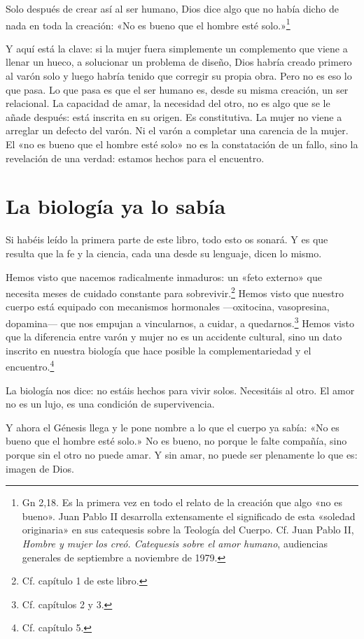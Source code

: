 Solo después de crear así al ser humano, Dios dice algo que no había dicho de nada en toda la creación: «No es bueno que el hombre esté solo.»\footnote{Gn 2,18. Es la primera vez en todo el relato de la creación que algo «no es bueno». Juan Pablo II desarrolla extensamente el significado de esta «soledad originaria» en sus catequesis sobre la Teología del Cuerpo. Cf. Juan Pablo II, \textit{Hombre y mujer los creó. Catequesis sobre el amor humano}, audiencias generales de septiembre a noviembre de 1979.}

Y aquí está la clave: si la mujer fuera simplemente un complemento que viene a llenar un hueco, a solucionar un problema de diseño, Dios habría creado primero al varón solo y luego habría tenido que corregir su propia obra. Pero no es eso lo que pasa. Lo que pasa es que el ser humano es, desde su misma creación, un ser relacional. La capacidad de amar, la necesidad del otro, no es algo que se le añade después: está inscrita en su origen. Es constitutiva. La mujer no viene a arreglar un defecto del varón. Ni el varón a completar una carencia de la mujer. El «no es bueno que el hombre esté solo» no es la constatación de un fallo, sino la revelación de una verdad: estamos hechos para el encuentro.

\section{La biología ya lo sabía}

Si habéis leído la primera parte de este libro, todo esto os sonará. Y es que resulta que la fe y la ciencia, cada una desde su lenguaje, dicen lo mismo.

Hemos visto que nacemos radicalmente inmaduros: un «feto externo» que necesita meses de cuidado constante para sobrevivir.\footnote{Cf. capítulo 1 de este libro.} Hemos visto que nuestro cuerpo está equipado con mecanismos hormonales ---oxitocina, vasopresina, dopamina--- que nos empujan a vincularnos, a cuidar, a quedarnos.\footnote{Cf. capítulos 2 y 3.} Hemos visto que la diferencia entre varón y mujer no es un accidente cultural, sino un dato inscrito en nuestra biología que hace posible la complementariedad y el encuentro.\footnote{Cf. capítulo 5.}

La biología nos dice: no estáis hechos para vivir solos. Necesitáis al otro. El amor no es un lujo, es una condición de supervivencia.

Y ahora el Génesis llega y le pone nombre a lo que el cuerpo ya sabía: «No es bueno que el hombre esté solo.» No es bueno, no porque le falte compañía, sino porque sin el otro no puede amar. Y sin amar, no puede ser plenamente lo que es: imagen de Dios.

